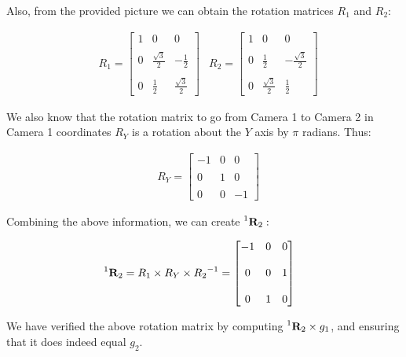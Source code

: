 \documentclass[12pt, oneside]{article}
\begin{document}
Also, from the provided picture we can obtain the rotation matrices $R_1$ and 
$R_2$:

\begin{align*}
    & R_1 =  
    \begin{bmatrix} 1 & 0 & 0 \\ \\ 
                    0 & \frac{\sqrt{3}}{2} & -\frac{1}{2}\\ \\ 
                    0 & \frac{1}{2} & \frac{\sqrt{3}}{2} \end{bmatrix} 
    & R_2 =  
    \begin{bmatrix} 1 & 0 & 0 \\ \\ 
                    0 & \frac{1}{2} & -\frac{\sqrt{3}}{2}\\ \\ 
                    0 & \frac{\sqrt{3}}{2} & \frac{1}{2} \end{bmatrix} 
\end{align*}

We also know that the rotation matrix to go from Camera 1 to Camera 2 in Camera
1 coordinates $R_Y$ is a rotation about the $Y$ axis by $\pi$ radians. Thus:

\begin{align*}
    & R_Y =  
    \begin{bmatrix} -1  & 0 & 0 \\ \\ 
                    0   & 1 & 0 \\ \\ 
                    0   & 0 & -1 \end{bmatrix} 
\end{align*}

Combining the above information, we can create $ \prescript{1}{}{\mathbf{R}_2}:$

\begin{align*}
    & \prescript{1}{}{\mathbf{R}_2} 
    =  R_1 \times R_Y \times {R_2}^{-1}
    = \begin{bmatrix} -1  & 0 & 0 \\ \\ 
                    0   & 0 & 1 \\ \\ 
                    0   & 1 & 0 \end{bmatrix} 
\end{align*}

We have verified the above rotation matrix by computing 
$ \prescript{1}{}{\mathbf{R}_2} \times g_1$, and ensuring that it does indeed
equal $g_2$.
\end{document}
